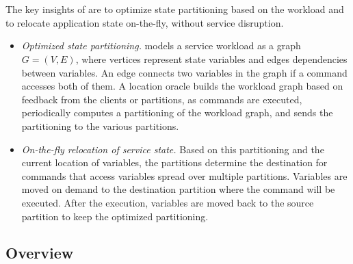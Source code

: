 \section{\dynastar}
\label{sec:dynastar}

The key insights of \dynastar are to optimize state partitioning based on the workload and to relocate application state on-the-fly, without service disruption.
\begin{itemize}
\item \emph{Optimized state partitioning.}
\dynastar models a service workload as a graph $G = (V, E)$, where vertices represent state variables and edges dependencies between variables.
An edge connects two variables in the graph if a command accesses both of them.
A location oracle builds the workload graph based on feedback from the clients or partitions, as commands are executed, periodically computes a partitioning of the workload graph, and sends the partitioning to the various partitions.

\item \emph{On-the-fly relocation of service state.}
Based on this partitioning and the current location of variables, the partitions determine the destination for commands that access variables spread over multiple partitions.
Variables are moved on demand to the destination partition where the command will be executed. After the execution, variables are moved back to the source partition to keep the optimized partitioning.
\end{itemize}


\subsection{Overview}



